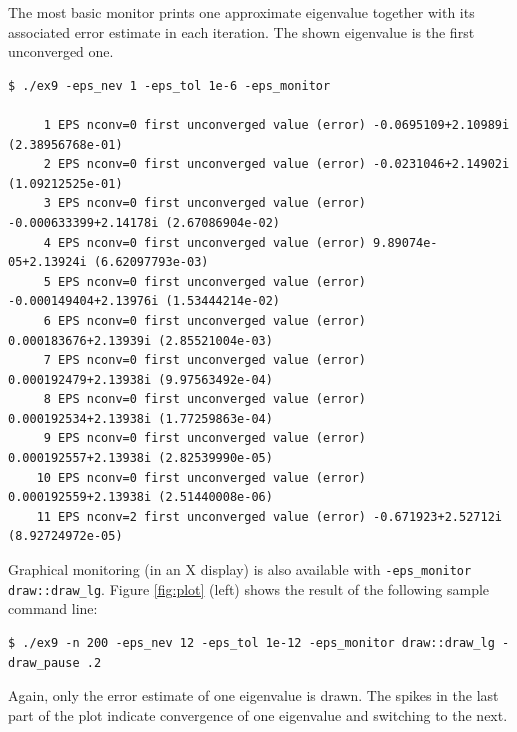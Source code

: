 The most basic monitor prints one approximate eigenvalue together with its associated error estimate in each iteration. The shown eigenvalue is the first unconverged one.
\begin{Verbatim}[fontsize=\footnotesize,numbers=none]
   $ ./ex9 -eps_nev 1 -eps_tol 1e-6 -eps_monitor

     1 EPS nconv=0 first unconverged value (error) -0.0695109+2.10989i (2.38956768e-01)
     2 EPS nconv=0 first unconverged value (error) -0.0231046+2.14902i (1.09212525e-01)
     3 EPS nconv=0 first unconverged value (error) -0.000633399+2.14178i (2.67086904e-02)
     4 EPS nconv=0 first unconverged value (error) 9.89074e-05+2.13924i (6.62097793e-03)
     5 EPS nconv=0 first unconverged value (error) -0.000149404+2.13976i (1.53444214e-02)
     6 EPS nconv=0 first unconverged value (error) 0.000183676+2.13939i (2.85521004e-03)
     7 EPS nconv=0 first unconverged value (error) 0.000192479+2.13938i (9.97563492e-04)
     8 EPS nconv=0 first unconverged value (error) 0.000192534+2.13938i (1.77259863e-04)
     9 EPS nconv=0 first unconverged value (error) 0.000192557+2.13938i (2.82539990e-05)
    10 EPS nconv=0 first unconverged value (error) 0.000192559+2.13938i (2.51440008e-06)
    11 EPS nconv=2 first unconverged value (error) -0.671923+2.52712i (8.92724972e-05)
\end{Verbatim}

Graphical monitoring (in an X display) is also available with \Verb!-eps_monitor draw::draw_lg!. Figure \ref{fig:plot} (left) shows the result of the following sample command line:
\begin{Verbatim}[fontsize=\footnotesize,numbers=none]
   $ ./ex9 -n 200 -eps_nev 12 -eps_tol 1e-12 -eps_monitor draw::draw_lg -draw_pause .2
\end{Verbatim}
Again, only the error estimate of one eigenvalue is drawn. The spikes in the last part of the plot indicate convergence of one eigenvalue and switching to the next.

